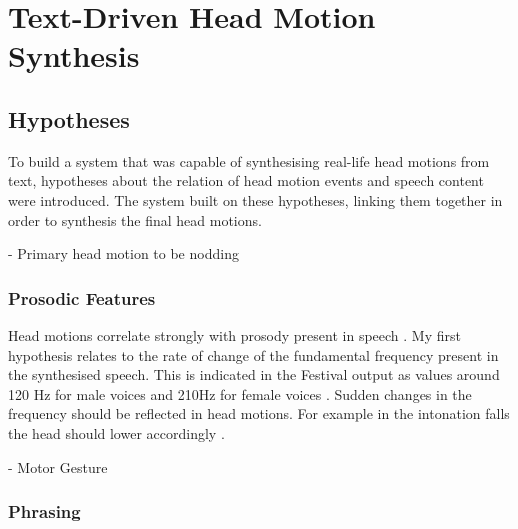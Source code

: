 \documentclass[bsc,frontabs,twoside,singlespacing,parskip]{infthesis}
\begin{document}
\chapter{Text-Driven Head Motion Synthesis}


\section{Hypotheses}

To build a system that was capable of synthesising real-life head motions from text, hypotheses about the relation of head motion events and speech content were introduced. The system built on these hypotheses, linking them together in order to synthesis the final head motions. 

\cite{first_paper} 
- Primary head motion to be nodding \\

\subsection{Prosodic Features}

Head motions correlate strongly with prosody present in speech \cite{vis_prosody}. My first hypothesis relates to the rate of change of the fundamental frequency present in the synthesised speech. This is indicated in the Festival output as values around 120 Hz for male voices and 210Hz for female voices \cite{f0_values}. Sudden changes in the frequency should be reflected in head motions. For example in the intonation falls the head should lower accordingly \cite{Kendon}.

- Motor Gesture \\

\subsection{Phrasing}
\end{document}
